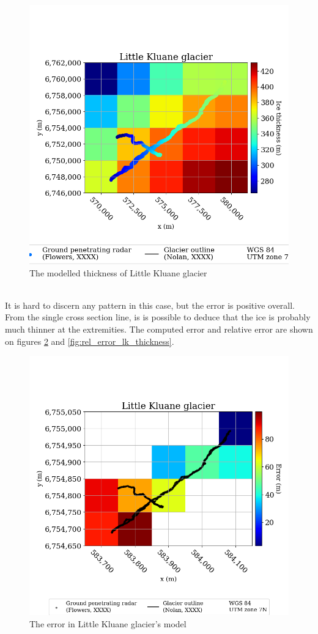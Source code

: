 \documentclass[a4, 12pt]{article}
\begin{document}
\begin{figure}[h!]
\centering
\includegraphics[scale=0.4]{../job_kluane_maps/Little Kluane glacier_cropped_thickness.png}
\caption{The modelled thickness of Little Kluane glacier}
\label{fig:cropped_lk_thickness}
\end{figure}
\\
It is hard to discern any  pattern in this case, but the error is positive overall. From the single cross section line, is is possible to deduce that the ice is probably much thinner at the extremities. The computed error and relative error are shown on figures \ref{fig:error_lk_thickness} and \ref{fig:rel_error_lk_thickness}.
\begin{figure}[h!]
\centering
\includegraphics[scale=0.4]{../job_kluane_maps/Little Kluane glacier_error.png}
\caption{The error in Little Kluane glacier's model}
\label{fig:error_lk_thickness}
\end{figure}
\end{document}
